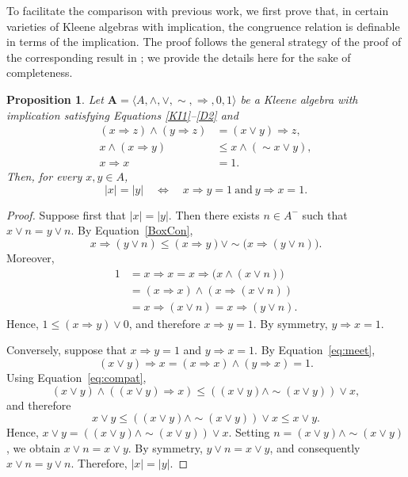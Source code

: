 \documentclass[10pt,a4paper]{amsart}
\newtheorem{proposition}[theorem]{Proposition}
\newcommand{\A}{\mathbf{A}}
\begin{document}
To facilitate the comparison with previous work, we first prove that, in certain varieties of Kleene algebras with implication, the congruence relation is definable in terms of the implication. The proof follows the general strategy of the proof of the corresponding result in \cite[p.~154]{viglizzo99algebras}; we provide the details here for the sake of completeness.


\begin{proposition}\label{congruenciaImplicacion}
Let $\A=\langle A,\wedge,\vee,\sim,\Rightarrow,0,1\rangle$ be a Kleene algebra with implication satisfying Equations \eqref{KI1}--\eqref{D2} and
\begin{align} 
(x\Rightarrow z)\wedge(y\Rightarrow z) &=(x\vee y)\Rightarrow z,\label{eq:meet}\tag{KI2}\\ 
x\wedge(x\Rightarrow y) &\le x\wedge(\sim x\vee y),\label{eq:compat}\tag{KI5}\\ 
x\Rightarrow x &=1.\label{eq:refl} \tag{KI6}
\end{align}
Then, for every $x,y\in A$,
\[
|x|=|y|
\quad\Longleftrightarrow\quad
x\Rightarrow y=1
\ \text{and}\
y\Rightarrow x=1.
\]
\end{proposition}
\begin{proof}
Suppose first that $|x|=|y|$. Then there exists $n\in A^{-}$ such that $x\vee n=y\vee n$. By Equation~\eqref{BoxCon},
\[
x\Rightarrow(y\vee n)
\leq
(x\Rightarrow y)\vee
\sim\bigl(x\Rightarrow(y\vee n)\bigr).
\]
Moreover,
\begin{align*}
1
&=x\Rightarrow x
=x\Rightarrow\bigl(x\wedge(x\vee n)\bigr)\\
&=(x\Rightarrow x)\wedge(x\Rightarrow(x\vee n))\\
&=x\Rightarrow(x\vee n)
=x\Rightarrow(y\vee n).
\end{align*}
Hence, $1\leq (x\Rightarrow y)\vee0$,
and therefore $x\Rightarrow y=1$. By symmetry, $y\Rightarrow x=1$.

Conversely, suppose that $x\Rightarrow y=1$ and $y\Rightarrow x=1$. By Equation~\eqref{eq:meet},
\[
(x\vee y)\Rightarrow x
=(x\Rightarrow x)\wedge(y\Rightarrow x)
=1.
\]
Using Equation~\eqref{eq:compat},
\[
(x\vee y)\wedge((x\vee y)\Rightarrow x)
\leq
((x\vee y)\wedge\sim(x\vee y))\vee x,
\]
and therefore
\[
x\vee y
\leq
((x\vee y)\wedge\sim(x\vee y))\vee x
\leq
x\vee y.
\]
Hence, $x\vee y=((x\vee y)\wedge\sim(x\vee y))\vee x$. Setting $n=(x\vee y)\wedge\sim(x\vee y)$, we obtain $x\vee n=x\vee y$. By symmetry, $y\vee n=x\vee y$, and consequently $x\vee n=y\vee n$. Therefore, $|x|=|y|$.
\end{proof}
\end{document}
